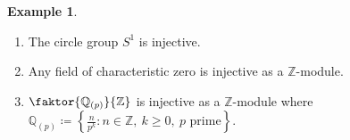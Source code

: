 \documentclass[10pt,letterpaper,cm]{nupset}
\theoremstyle{definition}
\newtheorem{exmp}[definition]{Example}
\theoremstyle{theorem}
\newtheorem{corollary}[definition]{Corollary}
\theoremstyle{remark}
\newcommand{\Q}{\mathbb Q}
\newcommand{\Z}{\mathbb Z}
\newcommand{\1}{\mathbf{1}}
\newcommand{\0}{\vec 0}
\begin{document}
\begin{exmp}
\begin{enumerate}
\begin{proof}
For each $\tilde{a} \in \tilde{A}$, write $\tilde{a} = a + mx$ for some $a\in A$ and some $m\in \Z$. Let $$\tilde{\xi}(\tilde{a}) = \xi(a) + m\tilde{\xi}(x).$$
We claim that $\tilde{\xi}$ is well-defined. If $\{n \in \Z : nx \in A\} = (0)$, then $\tilde{\xi}(x) =0$ and $\tilde{\xi}(\tilde{a}) = \xi(a)$, where $a$ is uniquely determined from $\tilde{a}$.  If $\{n \in \Z : nx \in A\} = (n_0)$, then $\tilde{\xi}(\tilde{a}) = \xi(a) + \frac{m\xi(n_0x)}{n_0}$. If $\tilde{a} = b + kx$, then $a-b = (k-m)x $. If this equals $0$, then we're done.
Otherwise, $k-m = dn_0$ for some integer $d\ne 0$.  Then 
\begin{align*} 
 0 & = \xi(a-b) - \xi((k-m)x) = \xi(a) - \xi(b) - \xi(dn_0x) 
\\ & =  \xi(a) - \xi(b) - \tilde{\xi}(dn_0x) =  \xi(a) - \xi(b) -dn_0 \tilde{\xi}(x)
\\ & =  \xi(a) - \xi(b) -(k-m) \tilde{\xi}(x) = \xi(a) - \xi(b) +\frac{m-k}{n_0}\xi(n_0x)
\\ & = \tilde{\xi}(a+mx) - \tilde{\xi}(b+kx).
\end{align*}
This confirms that $\tilde{\xi}$ is well-defined. Thus,
we have shown that $(\tilde{A}, \tilde{\xi}) > (A, \xi)$, a contradiction. 
\end{proof}
\begin{corollary}
Any divisible abelian group is injective.
\end{corollary}
\item The circle group $S^1$ is injective.
\item Any field of characteristic zero is injective as a $\Z$-module. 
\item $\faktor{\Q_{(p)}}{\Z}$ is injective as a $\Z$-module where $\Q_{(p)} \coloneqq  \left\{\frac{n}{p^k} : n \in \Z, \ k\geq 0,  \ p \text{ prime}  \right\}$.
\end{enumerate}
\end{exmp}
\end{document}
